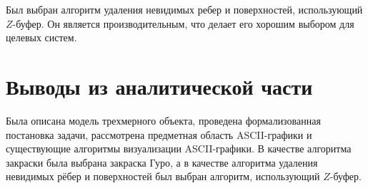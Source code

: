 Был выбран алгоритм удаления невидимых ребер и поверхностей, использующий $Z$-буфер. Он является производительным, что делает его хорошим выбором для целевых систем.

\section{Выводы из аналитической части}
Была описана модель трехмерного объекта, проведена формализованная постановка задачи, рассмотрена предметная область ASCII-графики и существующие алгоритмы визуализации ASCII-графики.
В качестве алгоритма закраски была выбрана закраска Гуро, а в качестве алгоритма удаления невидимых рёбер и поверхностей был выбран алгоритм, использующий $Z$-буфер.

\clearpage
